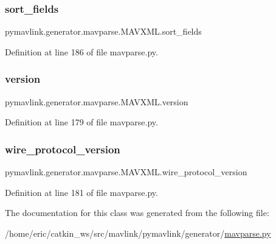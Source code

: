 \subsubsection{\texorpdfstring{sort\_fields}{sort\_fields}}
{\footnotesize\ttfamily pymavlink.\+generator.\+mavparse.\+M\+A\+V\+X\+M\+L.\+sort\+\_\+fields}



Definition at line 186 of file mavparse.\+py.

\mbox{\label{classpymavlink_1_1generator_1_1mavparse_1_1MAVXML_a79d2161209a9093e5fec4f3bf81108e8}} 
\subsubsection{\texorpdfstring{version}{version}}
{\footnotesize\ttfamily pymavlink.\+generator.\+mavparse.\+M\+A\+V\+X\+M\+L.\+version}



Definition at line 179 of file mavparse.\+py.

\mbox{\label{classpymavlink_1_1generator_1_1mavparse_1_1MAVXML_aadee007638f018e0c610f67157ea8cad}} 
\subsubsection{\texorpdfstring{wire\_protocol\_version}{wire\_protocol\_version}}
{\footnotesize\ttfamily pymavlink.\+generator.\+mavparse.\+M\+A\+V\+X\+M\+L.\+wire\+\_\+protocol\+\_\+version}



Definition at line 181 of file mavparse.\+py.



The documentation for this class was generated from the following file\+:\begin{DoxyCompactItemize}
\item 
/home/eric/catkin\+\_\+ws/src/mavlink/pymavlink/generator/\mbox{\hyperlink{mavparse_8py}{mavparse.\+py}}\end{DoxyCompactItemize}
